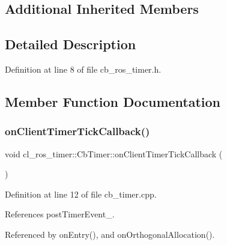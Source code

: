 \subsection*{Additional Inherited Members}


\subsection{Detailed Description}


Definition at line 8 of file cb\+\_\+ros\+\_\+timer.\+h.



\subsection{Member Function Documentation}
\mbox{\label{classcl__ros__timer_1_1CbTimer_a9895eb7e05a5922fa27f2bc46f5486a0}} 
\subsubsection{\texorpdfstring{on\+Client\+Timer\+Tick\+Callback()}{onClientTimerTickCallback()}}
{\footnotesize\ttfamily void cl\+\_\+ros\+\_\+timer\+::\+Cb\+Timer\+::on\+Client\+Timer\+Tick\+Callback (\begin{DoxyParamCaption}{ }\end{DoxyParamCaption})}



Definition at line 12 of file cb\+\_\+timer.\+cpp.



References post\+Timer\+Event\+\_\+.



Referenced by on\+Entry(), and on\+Orthogonal\+Allocation().


